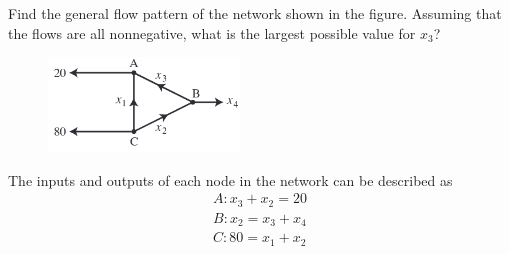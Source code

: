 \documentclass{../mathhomework}
\begin{document}
\begin{problem}[1.6\#11]
    Find the general flow pattern of the network shown in the figure. Assuming that the flows are all nonnegative, what
    is the largest possible value for $x_3$?

    \begin{figure}[h!]
        \begin{center}
            \includegraphics[width=2in]{figures/1_6_11.png}
        \end{center}
    \end{figure}

    \begin{solution}
        The inputs and outputs of each node in the network can be described as
        \begin{align*}
            A: x_3 + x_2 = 20 \\
            B: x_2 = x_3 + x_4 \\
            C: 80 = x_1 + x_2
        \end{align*}


\end{solution}
\end{problem}
\end{document}
